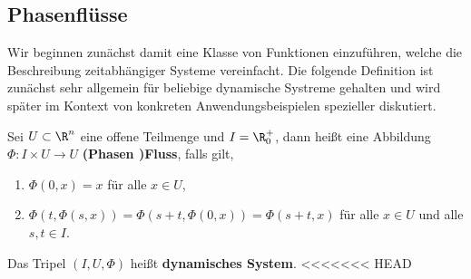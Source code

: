 \documentclass[letterpaper,10pt,english]{jupyterBook}
\begin{document}
\subsection{Phasenflüsse}
\label{\detokenize{ode/fluesse:phasenflusse}}
\par
Wir beginnen zunächst damit eine Klasse von Funktionen einzuführen, welche die Beschreibung zeitabhängiger Systeme vereinfacht.
Die folgende Definition ist zunächst sehr allgemein für beliebige dynamische Systreme gehalten und wird später im Kontext von konkreten Anwendungsbeispielen spezieller diskutiert.
\label{ode/fluesse:def:Fluss}
\begin{definition}{}{}



\par
Sei \(U \subset \R^n\) eine offene Teilmenge und \(I=\R^+_0\), dann heißt eine Abbildung \(\Phi:I\times U\rightarrow U\) \textbf{(Phasen )Fluss}, falls gilt,
\begin{enumerate}

\item {} 
\par
\(\Phi(0, x) = x\) für alle \(x\in U\),

\item {} 
\par
\(\Phi(t, \Phi(s,x)) = \Phi(s + t, \Phi(0, x)) = \Phi(s + t, x)\) für alle \(x\in U\) und alle \(s,t\in I\).

\end{enumerate}

\par
Das Tripel \((I, U, \Phi)\) heißt \textbf{dynamisches System}.
<<<<<<< HEAD
\end{definition}
\label{ode/fluesse:remark-1}
\end{document}
